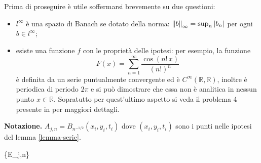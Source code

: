 \begin{remark}
Prima di proseguire è utile soffermarsi brevemente su due questioni:
\begin{itemize}
\item
$l^{\infty}$ è una spazio di Banach se dotato della norma: $\left\lVert b\right\rVert_\infty=\sup_n|b_n|$ per ogni $b \in l^{\infty}$;
\item
esiste una funzione $f$ con le proprietà delle ipotesi: per esempio, la funzione $$F(x)=\sum_{n=1}^\infty\frac{\cos(n!\,x)}{(n!)^n}$$ è definita da un serie puntualmente convergente ed è $C^{\infty}(\mathbb{R},\mathbb{R})$, inoltre è periodica di periodo $2\pi$ e si può dimostrare che essa non è analitica in nessun punto $x\in\mathbb{R}$. Sopratutto per quest'ultimo aspetto si veda il problema 4 presente in \cite[cap.3]{John} per maggiori dettagli.
\end{itemize}
\end{remark}
\textbf{Notazione.} $A_{j,n} = B_{n^{-1/2}}(x_i,y_i,t_i)$ dove $(x_i,y_i,t_i)$ sono i punti nelle ipotesi del lemma \ref{lemma-serie}.
\begin{lemma}\label{lemma-e}
{\{E_{j,n}\} }
\end{lemma}

